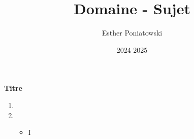 \documentclass[10pt,a4paper]{article}
\title{Domaine - Sujet}
\author{Esther Poniatowski}
\date{2024-2025}
\begin{document}
\q \textbf{Titre}

\begin{enumerate}
    \item

    \item
    \begin{itemize}
        \item I
    \end{itemize}
\end{enumerate}
\end{document}
